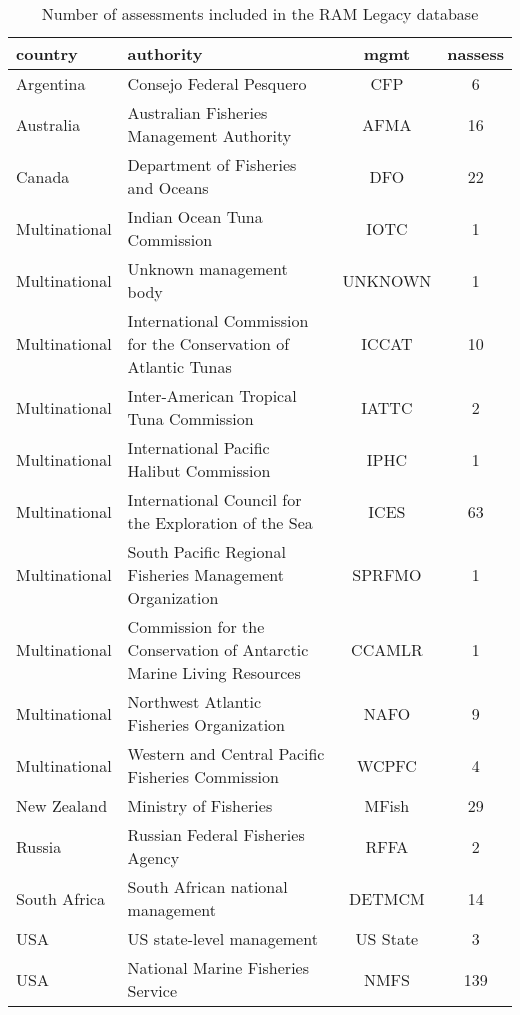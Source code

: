 \begin{table}[ht]
\begin{center}
\caption{Number of assessments included in the RAM Legacy database}
\label{tab:mgmt}
\begin{tabular}{p{3cm}p{5cm}cc}
  \hline
country & authority & mgmt & nassess \\ 
  \hline
Argentina & Consejo Federal Pesquero & CFP &   6 \\ 
  Australia & Australian Fisheries Management Authority & AFMA &  16 \\ 
  Canada & Department of Fisheries and Oceans & DFO &  22 \\ 
  Multinational & Indian Ocean Tuna Commission & IOTC &   1 \\ 
  Multinational & Unknown management body & UNKNOWN &   1 \\ 
  Multinational & International Commission for the Conservation of Atlantic Tunas & ICCAT &  10 \\ 
  Multinational & Inter-American Tropical Tuna Commission & IATTC &   2 \\ 
  Multinational & International Pacific Halibut Commission & IPHC &   1 \\ 
  Multinational & International Council for the Exploration of the Sea & ICES &  63 \\ 
  Multinational & South Pacific Regional Fisheries Management Organization & SPRFMO &   1 \\ 
  Multinational & Commission for the Conservation of Antarctic Marine Living Resources & CCAMLR &   1 \\ 
  Multinational & Northwest Atlantic Fisheries Organization & NAFO &   9 \\ 
  Multinational & Western and Central Pacific Fisheries Commission & WCPFC &   4 \\ 
  New Zealand & Ministry of Fisheries & MFish &  29 \\ 
  Russia & Russian Federal Fisheries Agency & RFFA &   2 \\ 
  South Africa & South African national management & DETMCM &  14 \\ 
  USA & US state-level management & US State &   3 \\ 
  USA & National Marine Fisheries Service & NMFS & 139 \\ 
   \hline
\end{tabular}
\end{center}
\end{table}
